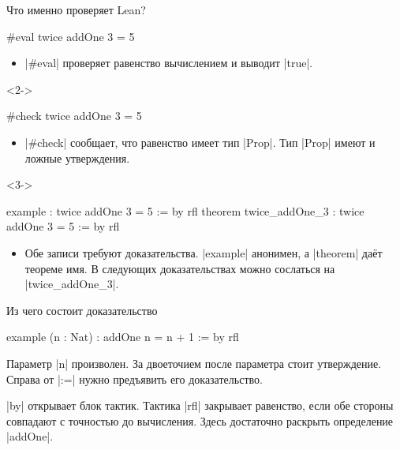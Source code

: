 \documentclass[aspectratio=169]{beamer}
\begin{document}
\begin{frame}[fragile]{Что именно проверяет Lean?}
\begin{lean}
#eval twice addOne 3 = 5
\end{lean}
\begin{itemize}
\item \leaninline|#eval| проверяет равенство вычислением и выводит \leaninline|true|.
\end{itemize}
\begin{uncoverenv}<2->
\begin{lean}
#check twice addOne 3 = 5
\end{lean}
\begin{itemize}
\item \leaninline|#check| сообщает, что равенство имеет тип \leaninline|Prop|. Тип \leaninline|Prop| имеют и ложные утверждения.
\end{itemize}
\end{uncoverenv}
\begin{uncoverenv}<3->
\begin{lean}
  example                 : twice addOne 3 = 5 := by rfl
  theorem twice_addOne_3  : twice addOne 3 = 5 := by rfl
\end{lean}
\begin{itemize}
\item Обе записи требуют доказательства. \leaninline|example| анонимен, а \leaninline|theorem| даёт теореме имя. В следующих доказательствах можно сослаться на \leaninline|twice_addOne_3|.
\end{itemize}
\end{uncoverenv}
\end{frame}

\begin{frame}[fragile]{Из чего состоит доказательство}
\begin{lean}
example (n : Nat) : addOne n = n + 1 := by
  rfl
\end{lean}
Параметр \leaninline|n| произволен. За двоеточием после параметра стоит утверждение. Справа от \leaninline|:=| нужно предъявить его доказательство.

\leaninline|by| открывает блок тактик. Тактика \leaninline|rfl| закрывает равенство, если обе стороны совпадают с точностью до вычисления. Здесь достаточно раскрыть определение \leaninline|addOne|.
\end{frame}
\end{document}
